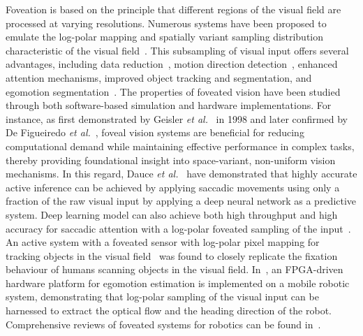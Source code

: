 Foveation is based on the principle that different regions of the visual field are processed at varying resolutions. Numerous systems have been proposed to emulate the log-polar mapping and spatially variant sampling distribution characteristic of the visual field~\cite{chessa2016space,GrimesDickeyPishko_2006_EncyclopediaSensors}. This subsampling of visual input offers several advantages, including data reduction~\cite{d2020event}, motion direction detection~\cite{d2020event}, enhanced attention mechanisms, improved object tracking and segmentation, and egomotion segmentation~\cite{BolducLevine_1998_ReviewBiologicallyMotivated}.
The properties of foveated vision have been studied through both software-based simulation and hardware implementations. For instance, as first demonstrated by Geisler \emph{et al.}~\cite{geisler1998real} in 1998 and later confirmed by De Figueiredo \emph{et al.}~\cite{de2023overview}, foveal vision systems are beneficial for reducing computational demand while maintaining effective performance in complex tasks, thereby providing foundational insight into space-variant, non-uniform vision mechanisms. In this regard, Dauce \emph{et al.}~\cite{Dauce_2018_ActiveFoveaBasedVision} have demonstrated that highly accurate active inference can be achieved by applying saccadic movements using only a fraction of the raw visual input by applying a deep neural network as a predictive system. Deep learning model can also achieve both high throughput and high accuracy for saccadic attention with a log-polar foveated sampling of the input~\cite{LukanovKonigPipa_2021_BiologicallyInspiredDeep}. An active system with a foveated sensor with log-polar pixel mapping for tracking objects in the visual field~\cite{YamamotoYeshurunLevine_1996_ActiveFoveatedVision} was found to closely replicate the fixation behaviour of humans scanning objects in the visual field. In~\cite{LamTsangMengEtAl_2006_NeuromorphicTranslationalEgomotion}, an FPGA-driven hardware platform for egomotion estimation is implemented on a mobile robotic system, demonstrating that log-polar sampling of the visual input can be harnessed to extract the optical flow and the heading direction of the robot. Comprehensive reviews of foveated systems for robotics can be found in~\cite{BolducLevine_1998_ReviewBiologicallyMotivated,JavierTraverBernardino_2010_ReviewLogpolarImaging}.

